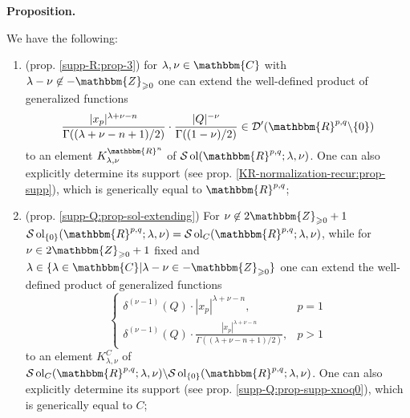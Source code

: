 \documentclass{article}
\newcommand{\nin}{\not\in}
\newcommand{\tmop}[1]{\ensuremath{\operatorname{#1}}}
\newcommand{\tmtextbf}[1]{{\bfseries{#1}}}
\newcommand{\tmtextit}[1]{{\itshape{#1}}}
\numberwithin{definition}{section}
\numberwithin{lemma}{section}
\numberwithin{proposition}{section}
{\theorembodyfont{\rmfamily}\newtheorem{remark}{Remark}
\numberwithin{remark}{section}
}
\begin{document}
{\noindent}\tmtextbf{Proposition. }\tmtextit{We have the following:
\begin{enumerate}
  \item (prop. \ref{supp-R:prop-3}) for $\lambda, \nu \in \mathbbm{C}$ with
  $\lambda - \nu \nin -\mathbbm{Z}_{\geqslant 0}$ one can extend the
  well-defined product of generalized functions
  \[ \frac{| x_p |^{\lambda + \nu - n}}{\Gamma ( ( \lambda + \nu - n + 1) /
     2)} \cdot \frac{| Q |^{- \nu}}{\Gamma ( ( 1 - \nu) / 2)} \in \mathcal{D}'
     ( \mathbbm{R}^{p, q} \backslash \{ 0 \}) \]
  to an element $K_{\lambda, \nu}^{\mathbbm{R}^n}$ of $\mathcal{S} \tmop{ol} (
  \mathbbm{R}^{p, q} ; \lambda, \nu)$. One can also explicitly determine its
  support (see prop. \ref{KR-normalization-recur:prop-supp}), which is
  generically equal to $\mathbbm{R}^{p, q}$;
  
  \item (prop. \ref{supp-Q:prop-sol-extending}) For $\nu \nin
  2\mathbbm{Z}_{\geqslant 0} + 1$ $\mathcal{S} \tmop{ol}_{\{ 0 \}} (
  \mathbbm{R}^{p, q} ; \lambda, \nu) =\mathcal{S} \tmop{ol}_C (
  \mathbbm{R}^{p, q} ; \lambda, \nu)$, while for $\nu \in
  2\mathbbm{Z}_{\geqslant 0} + 1$ fixed and $\lambda \in \{ \lambda \in
  \mathbbm{C} | \lambda - \nu \in -\mathbbm{Z}_{\geqslant 0} \}$ one can
  extend the well-defined product of generalized functions
  \[ \left\{ \begin{array}{ll}
       \delta^{( \nu - 1)} ( Q) \cdot | x_p |^{\lambda + \nu - n}, & p = 1\\
       \delta^{( \nu - 1)} ( Q) \cdot \frac{| x_p |^{\lambda + \nu -
       n}}{\Gamma ( ( \lambda + \nu - n + 1) / 2)}, & p > 1
     \end{array} \right. \]
  to an element $K_{\lambda, \nu}^C$ of $\mathcal{S} \tmop{ol}_C (
  \mathbbm{R}^{p, q} ; \lambda, \nu) \backslash\mathcal{S} \tmop{ol}_{\{ 0 \}}
  ( \mathbbm{R}^{p, q} ; \lambda, \nu)$. One can also explicitly determine its
  support (see prop. \ref{supp-Q:prop-supp-xnoq0}), which is generically equal
  to $C$;
  

\end{enumerate}}
\end{document}
